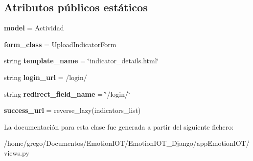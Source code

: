 \subsection*{Atributos públicos estáticos}
\begin{DoxyCompactItemize}
\item 
{\bfseries model} = Actividad\hypertarget{classappEmotionIOT_1_1views_1_1Create__indicator_ab6c4184bce721c7530570a98b991a13e}{}\label{classappEmotionIOT_1_1views_1_1Create__indicator_ab6c4184bce721c7530570a98b991a13e}

\item 
{\bfseries form\+\_\+class} = Upload\+Indicator\+Form\hypertarget{classappEmotionIOT_1_1views_1_1Create__indicator_a1437fb0ac03e58bc5cdbf9a32b938e2f}{}\label{classappEmotionIOT_1_1views_1_1Create__indicator_a1437fb0ac03e58bc5cdbf9a32b938e2f}

\item 
string {\bfseries template\+\_\+name} = \char`\"{}indicator\+\_\+details.\+html\char`\"{}\hypertarget{classappEmotionIOT_1_1views_1_1Create__indicator_ad4e61eaf6469670dd7f10cd788c97225}{}\label{classappEmotionIOT_1_1views_1_1Create__indicator_ad4e61eaf6469670dd7f10cd788c97225}

\item 
string {\bfseries login\+\_\+url} = \textquotesingle{}/login/\textquotesingle{}\hypertarget{classappEmotionIOT_1_1views_1_1Create__indicator_a3e2817aaa4c8ed3dd42465d903695ee4}{}\label{classappEmotionIOT_1_1views_1_1Create__indicator_a3e2817aaa4c8ed3dd42465d903695ee4}

\item 
string {\bfseries redirect\+\_\+field\+\_\+name} = \char`\"{}/login/\char`\"{}\hypertarget{classappEmotionIOT_1_1views_1_1Create__indicator_aff7b6c2f621e4fe272e6bae7b0bd8a02}{}\label{classappEmotionIOT_1_1views_1_1Create__indicator_aff7b6c2f621e4fe272e6bae7b0bd8a02}

\item 
{\bfseries success\+\_\+url} = reverse\+\_\+lazy(\textquotesingle{}indicators\+\_\+list\textquotesingle{})\hypertarget{classappEmotionIOT_1_1views_1_1Create__indicator_ad249a7d5cdd5abe8468f42ad626dfcfb}{}\label{classappEmotionIOT_1_1views_1_1Create__indicator_ad249a7d5cdd5abe8468f42ad626dfcfb}

\end{DoxyCompactItemize}


La documentación para esta clase fue generada a partir del siguiente fichero\+:\begin{DoxyCompactItemize}
\item 
/home/grego/\+Documentos/\+Emotion\+I\+O\+T/\+Emotion\+I\+O\+T\+\_\+\+Django/app\+Emotion\+I\+O\+T/views.\+py\end{DoxyCompactItemize}
